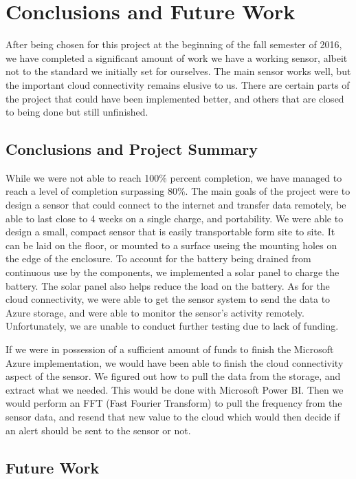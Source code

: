 \documentclass[11pt]{article}
\begin{document}
\section{Conclusions and Future Work}


After being chosen for this project at the beginning of the fall semester of 2016, we have completed a significant amount of work we have a working sensor, albeit not to the standard we initially set for ourselves. The main sensor works well, but the important cloud connectivity remains elusive to us. There are certain parts of the project that could have been implemented better, and others that are closed to being done but still unfinished.


\subsection{Conclusions and Project Summary}
While we were not able to reach 100\% percent completion, we have managed to reach a level of completion surpassing 80\%. The main goals of the project were to design a sensor that could connect to the internet and transfer data remotely, be able to last close to 4 weeks on a single charge, and portability. We were able to design a small, compact sensor that is easily transportable form site to site. It can be laid on the floor, or mounted to a surface useing the mounting holes on the edge of the enclosure. To account for the battery being drained from continuous use by the components, we implemented a solar panel to charge the battery. The solar panel also helps reduce the load on the battery. As for the cloud connectivity, we were able to get the sensor system to send the data to Azure storage, and were able to monitor the sensor's activity remotely. Unfortunately, we are unable to conduct further testing due to lack of funding.  

If we were in possession of a sufficient amount of funds to finish the Microsoft Azure implementation, we would have been able to finish the cloud connectivity aspect of the sensor. We figured out how to pull the data from the storage, and extract what we needed. This would be done with Microsoft Power BI. Then we would perform an FFT (Fast Fourier Transform) to pull the frequency from the sensor data, and resend that new value to the cloud which would then decide if an alert should be sent to the sensor or not.

 

\subsection{Future Work}
\end{document}
